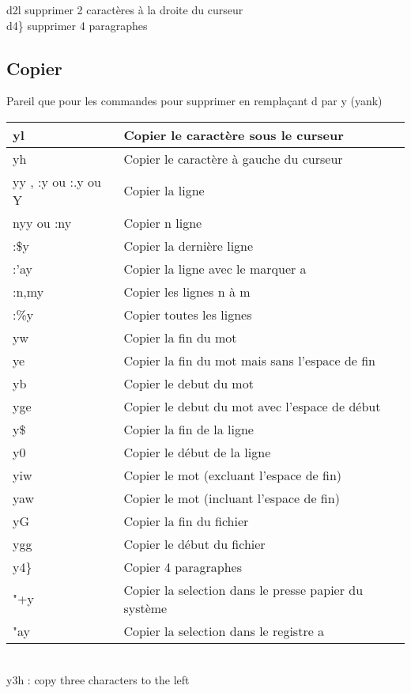 \documentclass{article}
\begin{document}
                            d2l supprimer 2 caractères à la droite du curseur\\
                        d4\} supprimer 4 paragraphes\\

                        \subsection{Copier}
                        Pareil que pour les commandes pour supprimer en remplaçant d par y (yank)\\


                        \begin{tabular}{|p{3cm}| l| }\hline
                            yl & Copier le caractère sous le curseur \\ \hline
                            yh & Copier le caractère à gauche du curseur \\ \hline
                            yy , :y ou :.y ou Y & Copier la ligne \\ \hline
                            nyy ou :ny & Copier n ligne \\ \hline
                            :\$y & Copier la dernière ligne \\ \hline
                            :'ay & Copier la ligne avec le marquer a \\ \hline
                            :n,my & Copier les lignes n à m \\ \hline
                            :\%y & Copier toutes les lignes \\ \hline
                            yw & Copier la fin du mot \\ \hline
                            ye & Copier la fin du mot mais sans l'espace de fin\\ \hline
                            yb & Copier le debut du mot\\ \hline
                            yge & Copier le debut du mot avec l'espace de début\\ \hline
                            y\$ & Copier la fin de la ligne \\ \hline
                            y0 & Copier le début de la ligne \\ \hline
                            yiw & Copier le mot (excluant l'espace de fin)\\ \hline
                            yaw & Copier le mot (incluant l'espace de fin)\\ \hline
                            yG & Copier la fin du fichier\\ \hline
                            ygg & Copier le début du fichier\\ \hline
                        y4\} & Copier 4 paragraphes\\ \hline
                        "+y & Copier la selection dans le presse papier du système\\ \hline
                        "ay & Copier la selection dans le registre a\\ \hline
                    \end{tabular}\\
                    y3h : copy three characters to the left
\end{document}
